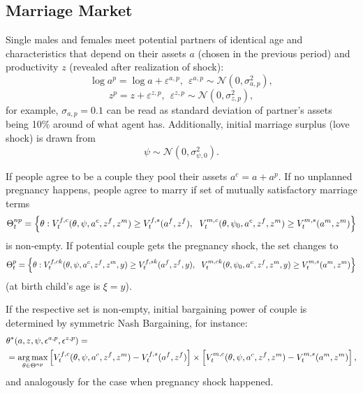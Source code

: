 \documentclass[12pt,letter]{article}
\DeclareMathOperator*{\argmax}{\mathrm{arg\,max}}
\begin{document}
\subsection{Marriage Market}
Single males and females meet potential partners of identical age and characteristics that depend on their assets $a$ (chosen in the previous period) and productivity $z$ (revealed after realization of shock):
\begin{equation}\log a^p = \log a + \varepsilon^{a,p}, \ \ \varepsilon^{a,p} \sim \mathcal{N}(0,\sigma_{a,p}^2),\end{equation}
\begin{equation}	z^p = z + \varepsilon^{z,p}, \ \ \varepsilon^{z,p} \sim \mathcal{N}(0,\sigma_{z,p}^2),\end{equation}
for example, $\sigma_{a,p} = 0.1$ can be read as standard deviation of partner's assets being 10\% around of what agent has. 
Additionally, initial marriage surplus (love shock) is drawn from
\begin{equation} \psi \sim \mathcal{N}(0,\sigma_{\psi,0}^2).\end{equation}

If people agree to be a couple they pool their assets $a^c = a + a^p$. If no unplanned pregnancy happens, people agree to marry if set of mutually satisfactory marriage terms
\begin{equation}\small \Theta^{np}_t = \left\{ \theta : V_t^{f,c}(\theta,\psi,a^c,z^f,z^m) \geq V_t^{f,s}(a^f,z^f), \ \ V_t^{m,c}(\theta,\psi_0,a^c,z^f,z^m) \geq V_t^{m,s}(a^m,z^m)\right\}\end{equation}
is non-empty. If potential couple gets the pregnancy shock, the set changes to
\begin{equation} \small \Theta^{p}_t = \left\{ \theta : V_t^{f,ck}(\theta,\psi,a^c,z^f,z^m,y) \geq V_t^{f,sk}(a^f,z^f,y), \ \ V_t^{m,ck}(\theta,\psi_0,a^c,z^f,z^m,y) \geq V_t^{m,s}(a^m,z^m)\right\} \end{equation}
(at birth child's age is $\xi = y$).

If the respective set is non-empty, initial bargaining power of couple is determined by symmetric Nash Bargaining, for instance:
\small
\begin{align}&\theta^*(a,z,\psi,\epsilon^{a,p},\epsilon^{z,p}) = \label{nbs} \\ \nonumber &= \argmax\limits_{\theta \in \Theta^{np}} \left[V_t^{f,c}(\theta,\psi,a^c,z^f,z^m) - V_t^{f,s}(a^f,z^f)\right] \times \left[V_t^{\vphantom{f}m,c}(\theta,\psi,a^c,z^f,z^m) - V_t^{m,s}(a^m,z^m)\right],\end{align}
and analogously for the case when pregnancy shock happened.
\end{document}
